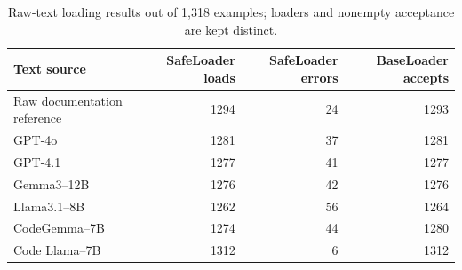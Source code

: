 \begin{table}[H]
\centering\small
\caption{Raw-text loading results out of 1,318 examples; loaders and nonempty acceptance are kept distinct.}
\label{tab:parser}
\begin{tabular}{@{}lrrr@{}}
\toprule
Text source & SafeLoader loads & SafeLoader errors & BaseLoader accepts\\
\midrule
Raw documentation reference & 1294 & 24 & 1293\\
GPT-4o & 1281 & 37 & 1281\\
GPT-4.1 & 1277 & 41 & 1277\\
Gemma3--12B & 1276 & 42 & 1276\\
Llama3.1--8B & 1262 & 56 & 1264\\
CodeGemma--7B & 1274 & 44 & 1280\\
Code Llama--7B & 1312 & 6 & 1312\\
\bottomrule
\end{tabular}
\par\vspace{0.3em}{\footnotesize BaseLoader acceptance additionally excludes empty documents. These counts are parser outcomes, not GitHub Actions validity rates.}
\end{table}
